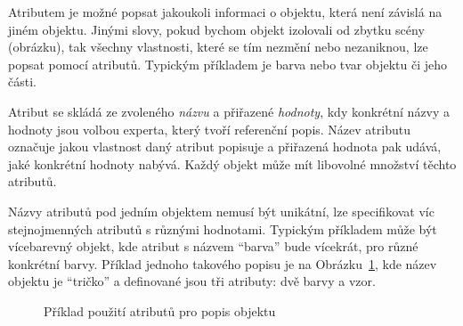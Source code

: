 Atributem je možné popsat jakoukoli informaci o objektu, která není závislá na jiném objektu.
Jinými slovy, pokud bychom objekt izolovali od zbytku scény (obrázku), tak všechny vlastnosti, které se tím nezmění nebo nezaniknou, lze popsat pomocí atributů.
Typickým příkladem je barva nebo tvar objektu či jeho části.

Atribut se skládá ze zvoleného \emph{názvu} a přiřazené \emph{hodnoty}, kdy konkrétní názvy a hodnoty jsou volbou experta, který tvoří referenční popis.
Název atributu označuje jakou vlastnost daný atribut popisuje a přiřazená hodnota pak udává, jaké konkrétní hodnoty nabývá.
Každý objekt může mít libovolné množství těchto atributů.

Názvy atributů pod jedním objektem nemusí být unikátní, lze specifikovat víc stejnojmenných atributů s různými hodnotami.
Typickým příkladem může být vícebarevný objekt, kde atribut s názvem \enquote{barva} bude vícekrát, pro různé konkrétní barvy.
Příklad jednoho takového popisu je na Obrázku~\ref{fig:example_tshirt}, kde název objektu je \enquote{tričko}
a definované jsou tři atributy: dvě barvy a vzor.

\begin{figure}[H]
	\centering
	\caption{Příklad použití atributů pro popis objektu}\label{fig:example_tshirt}
\end{figure}

